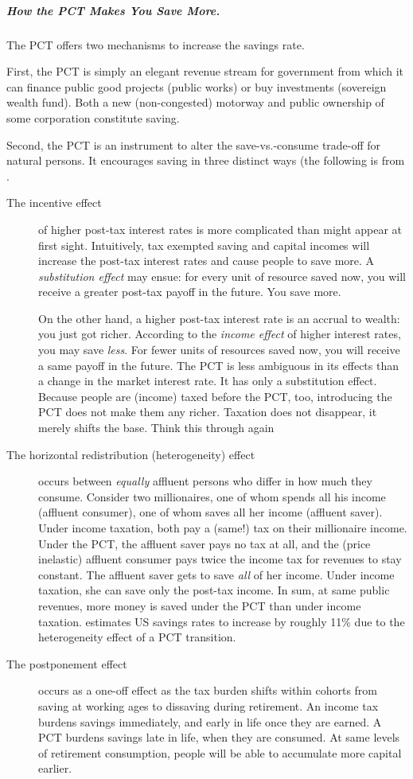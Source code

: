 \subparagraph{How the PCT Makes You Save More.} The PCT offers two mechanisms to increase the savings rate.

First, the PCT is simply an elegant revenue stream for government from which it can finance public good projects (public works) or buy investments (sovereign wealth fund).
Both a new (non-congested) motorway and public ownership of some corporation constitute saving.

Second, the PCT is an instrument to alter the save-vs.-consume trade-off for natural persons.
It encourages saving in three distinct ways (the following is from \citep[28ff]{Seidman1997}.
\begin{description}
	\item[The incentive effect] of higher post-tax interest rates is more complicated than might appear at first sight.
Intuitively, tax exempted saving and capital incomes will increase the post-tax interest rates and cause people to save more.
A \emph{substitution effect} may ensue:
for every unit of resource saved now, you will receive a greater post-tax payoff in the future.
You save more.

On the other hand, a higher post-tax interest rate is an accrual to wealth:
you just got richer.
According to the \emph{income effect} of higher interest rates, you may save \emph{less}.
For fewer units of resources saved now, you will receive a same payoff in the future.
The PCT is less ambiguous in its effects than a change in the market interest rate.
It has only a substitution effect.
Because people are (income) taxed before the PCT, too, introducing the PCT does not make them any richer.
Taxation does not disappear, it merely shifts the base.%
Think this through again
	\item[The horizontal redistribution (heterogeneity) effect] occurs between \emph{equally} affluent persons who differ in how much they consume.
Consider two millionaires, one of whom spends all his income (affluent consumer), one of whom saves all her income (affluent saver).
Under income taxation, both pay a (same!) tax on their millionaire income.
Under the PCT, the affluent saver pays no tax at all, and the (price inelastic) affluent consumer pays twice the income tax for revenues to stay constant.
The affluent saver gets to save \emph{all} of her income.
Under income taxation, she can save only the post-tax income.
In sum, at same public revenues, more money is saved under the PCT than under income taxation.
\citeauthor{Seidman1997} estimates US savings rates to increase by roughly 11\% due to the heterogeneity effect of a PCT transition.
	\item[The postponement effect] occurs as a one-off effect as the tax burden shifts within cohorts from saving at working ages to dissaving during retirement.
An income tax burdens savings immediately, and early in life once they are earned.
A PCT burdens savings late in life, when they are consumed.
At same levels of retirement consumption, people will be able to accumulate more capital earlier.


\end{description}
